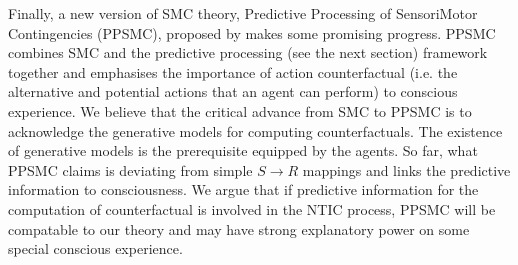 \documentclass[utf8]{article}
\begin{document}
            Finally, a new version of SMC theory, Predictive Processing of SensoriMotor Contingencies (PPSMC), proposed by \cite{seth2014predictive, seth2015presence} makes some promising progress. PPSMC combines SMC and the predictive processing (see the next section) framework together and emphasises the importance of action counterfactual (i.e. the alternative and potential actions that an agent can perform) to conscious experience. We believe that the critical advance from SMC to PPSMC is to acknowledge the generative models for computing counterfactuals. The existence of generative models is the prerequisite equipped by the agents. So far, what PPSMC claims is deviating from simple $S\rightarrow{}R$ mappings and links the predictive information to consciousness. We argue that if predictive information for the computation of counterfactual is involved in the NTIC process, PPSMC will be compatable to our theory and may have strong explanatory power on some special conscious experience. 

		
\end{document}
